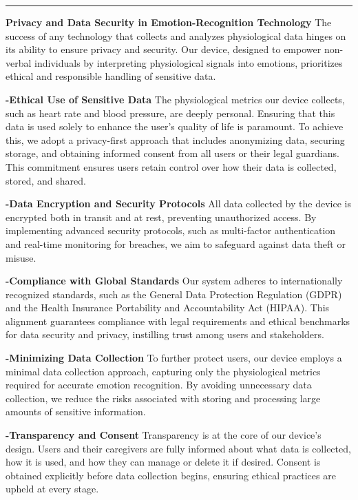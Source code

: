 \documentclass[12pt, research paper]{report}
\begin{document}
	\noindent \rule{13.85cm}{0.01cm}
	\noindent \textbf{Privacy and Data Security in Emotion-Recognition Technology}
	\newline The success of any technology that collects and analyzes physiological data hinges on its ability to ensure privacy and security. Our device, designed to empower non-verbal individuals by interpreting physiological signals into emotions, prioritizes ethical and responsible handling of sensitive data.
	\bigskip 
	
	
	\noindent \textbf{-Ethical Use of Sensitive Data}
	\newline The physiological metrics our device collects, such as heart rate and blood pressure, are deeply personal. Ensuring that this data is used solely to enhance the user's quality of life is paramount. To achieve this, we adopt a privacy-first approach that includes anonymizing data, securing storage, and obtaining informed consent from all users or their legal guardians. This commitment ensures users retain control over how their data is collected, stored, and shared.
	\bigskip 
	
	\noindent \textbf{-Data Encryption and Security Protocols}
	\newline All data collected by the device is encrypted both in transit and at rest, preventing unauthorized access. By implementing advanced security protocols, such as multi-factor authentication and real-time monitoring for breaches, we aim to safeguard against data theft or misuse.
	\bigskip 
	
	\noindent \textbf{-Compliance with Global Standards}
	\newline Our system adheres to internationally recognized standards, such as the General Data Protection Regulation (GDPR) and the Health Insurance Portability and Accountability Act (HIPAA). This alignment guarantees compliance with legal requirements and ethical benchmarks for data security and privacy, instilling trust among users and stakeholders.
	\bigskip 
	
	\noindent \textbf{-Minimizing Data Collection}
	\newline To further protect users, our device employs a minimal data collection approach, capturing only the physiological metrics required for accurate emotion recognition. By avoiding unnecessary data collection, we reduce the risks associated with storing and processing large amounts of sensitive information.
	\bigskip 
	
	\noindent \textbf{-Transparency and Consent}
	\noindent Transparency is at the core of our device's design. Users and their caregivers are fully informed about what data is collected, how it is used, and how they can manage or delete it if desired. Consent is obtained explicitly before data collection begins, ensuring ethical practices are upheld at every stage.
	\bigskip 
	
\end{document}
